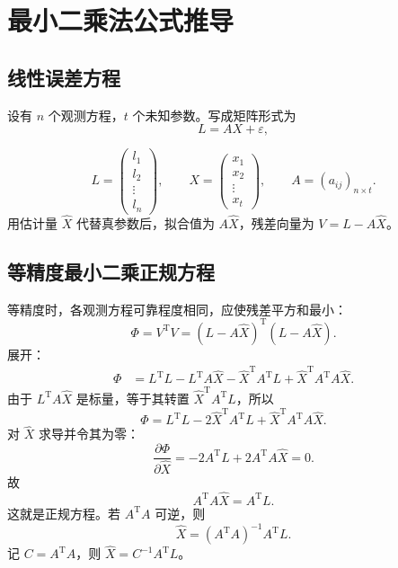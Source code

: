 \documentclass[UTF8,12pt,a4paper]{ctexart}
\newcommand{\T}{\mathrm{T}}
\begin{document}
\newpage

\section{最小二乘法公式推导}

\subsection{线性误差方程}
设有 $n$ 个观测方程，$t$ 个未知参数。写成矩阵形式为
\begin{equation*}
    L=A X+\varepsilon,
\end{equation*}

\begin{equation*}
    L=\begin{pmatrix}l_1\\l_2\\\vdots\\l_n\end{pmatrix},
    \qquad
    X=\begin{pmatrix}x_1\\x_2\\\vdots\\x_t\end{pmatrix},
    \qquad
    A=(a_{ij})_{n\times t} .
\end{equation*}
用估计量 $\hat{X}$ 代替真参数后，拟合值为 $A\hat{X}$，残差向量为 $V=L-A\hat{X}$。

\subsection{等精度最小二乘正规方程}
等精度时，各观测方程可靠程度相同，应使残差平方和最小：
\begin{equation*}
    \Phi=V^\T V=(L-A\hat{X})^\T(L-A\hat{X}) .
\end{equation*}
展开：
\begin{equation*}
\begin{aligned}
    \Phi
    &=L^\T L-L^\T A\hat{X}-\hat{X}^\T A^\T L+
      \hat{X}^\T A^\T A\hat{X} .
\end{aligned}
\end{equation*}
由于 $L^\T A\hat{X}$ 是标量，等于其转置 $\hat{X}^\T A^\T L$，所以
\begin{equation*}
    \Phi=L^\T L-2\hat{X}^\T A^\T L+
    \hat{X}^\T A^\T A\hat{X} .
\end{equation*}
对 $\hat{X}$ 求导并令其为零：
\begin{equation*}
    \frac{\partial\Phi}{\partial \hat{X}}
    =-2A^\T L+2A^\T A\hat{X}=0 .
\end{equation*}
故
\begin{equation*}
    A^\T A\hat{X}=A^\T L .
\end{equation*}
这就是正规方程。若 $A^\T A$ 可逆，则
\begin{equation*}
    \hat{X}=(A^\T A)^{-1}A^\T L .
\end{equation*}
记 $C=A^\T A$，则 $\hat{X}=C^{-1}A^\T L$。
\end{document}
